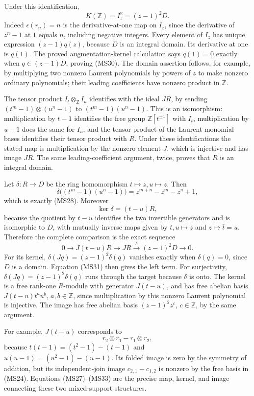 \documentclass[
]{article}
\begin{document}
Under this identification, \[
K(\mathbb Z)=I_z^2=(z-1)^2D.
\tag{MS30}
\] Indeed \(\epsilon(r_n)=n\) is the derivative-at-one map on \(I_z\),
since the derivative of \(z^n-1\) at \(1\) equals \(n\), including
negative integers. Every element of \(I_z\) has unique expression
\((z-1)q(z)\), because \(D\) is an integral domain. Its derivative at
one is \(q(1)\). The proved augmentation-kernel calculation says
\(q(1)=0\) exactly when \(q\in(z-1)D\), proving (MS30). The domain
assertion follows, for example, by multiplying two nonzero Laurent
polynomials by powers of \(z\) to make nonzero ordinary polynomials;
their leading coefficients have nonzero product in \(\mathbb Z\).

The tensor product \(I_t\otimes_{\mathbb Z}I_u\) identifies with the
ideal \(JR\), by sending \((t^m-1)\otimes(u^n-1)\) to
\((t^m-1)(u^n-1)\). This is an isomorphism: multiplication by \(t-1\)
identifies the free group \(\mathbb Z[t^{\pm1}]\) with \(I_t\),
multiplication by \(u-1\) does the same for \(I_u\), and the tensor
product of the Laurent monomial bases identifies their tensor product
with \(R\). Under these identifications the stated map is multiplication
by the nonzero element \(J\), which is injective and has image \(JR\).
The same leading-coefficient argument, twice, proves that \(R\) is an
integral domain.

Let \(\delta:R\to D\) be the ring homomorphism
\(t\mapsto z,u\mapsto z\). Then \[
\delta\bigl((t^m-1)(u^n-1)\bigr)
=z^{m+n}-z^m-z^n+1,
\] which is exactly (MS28). Moreover \[
\ker\delta=(t-u)R,
\tag{MS31}
\] because the quotient by \(t-u\) identifies the two invertible
generators and is isomorphic to \(D\), with mutually inverse maps given
by \(t,u\mapsto z\) and \(z\mapsto\overline t=\overline u\). Therefore
the complete comparison is the exact sequence \[
0\longrightarrow J(t-u)R
\longrightarrow JR
\xrightarrow{\ \delta\ }(z-1)^2D
\longrightarrow0.
\tag{MS32}
\] For its kernel, \(\delta(Jq)=(z-1)^2\delta(q)\) vanishes exactly when
\(\delta(q)=0\), since \(D\) is a domain. Equation (MS31) then gives the
left term. For surjectivity, \(\delta(Jq)=(z-1)^2\delta(q)\) runs
through the target because \(\delta\) is onto. The kernel is a free
rank-one \(R\)-module with generator \(J(t-u)\), and has free abelian
basis \(J(t-u)t^a u^b\), \(a,b\in\mathbb Z\), since multiplication by
this nonzero Laurent polynomial is injective. The image has free abelian
basis \((z-1)^2z^c\), \(c\in\mathbb Z\), by the same argument.

For example, \(J(t-u)\) corresponds to \[
r_2\otimes r_1-r_1\otimes r_2,
\tag{MS33}
\] because \(t(t-1)=(t^2-1)-(t-1)\) and \(u(u-1)=(u^2-1)-(u-1)\). Its
folded image is zero by the symmetry of addition, but its
independent-join image \(c_{2,1}-c_{1,2}\) is nonzero by the free basis
in (MS24). Equations (MS27)--(MS33) are the precise map, kernel, and
image connecting these two mixed-support structures.
\end{document}
